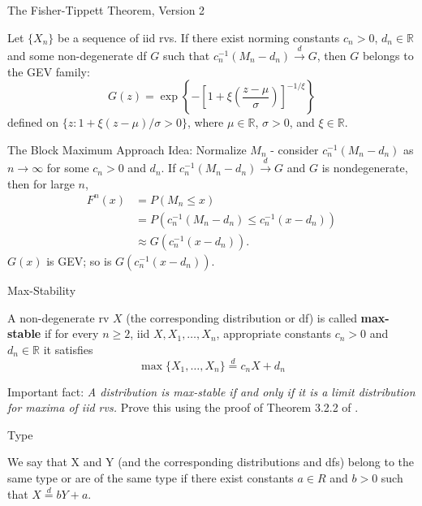 \documentclass{beamer}
\begin{document}
\begin{frame}{The Fisher-Tippett Theorem, Version 2}
    \begin{theorem}
        Let $\{X_n\}$ be a sequence of iid rvs. If there exist norming constants $c_n > 0$, $d_n \in \mathbb{R}$ and some non-degenerate df $G$ such that $c_n^{-1}(M_n - d_n) \xrightarrow{d} G$, then $G$ belongs to the GEV family:
        \[
        G(z) = \exp\left\{-\left[1 + \xi\left(\frac{z - \mu}{\sigma}\right)\right]^{-1 / \xi}\right\}
        \]
        defined on $\{z : 1 + \xi(z - \mu) / \sigma > 0\}$, where $\mu \in \mathbb{R}$, $\sigma > 0$, and $\xi \in \mathbb{R}$.
    \end{theorem}
\end{frame}

\begin{frame}{The Block Maximum Approach}
    Idea: Normalize $M_n$ - consider $c_n^{-1}(M_n - d_n)$ as $n \to \infty$ for some $c_n > 0$ and $d_n$. If $c_n^{-1}(M_n - d_n) \xrightarrow{d} G$ and $G$ is nondegenerate, then for large $n$,
    \begin{align*}
        F^n(x) &= P(M_n \le x) \\
        &= P(c_n^{-1}(M_n - d_n) \le c_n^{-1}(x - d_n)) \\
        &\approx G(c_n^{-1}(x - d_n)).
    \end{align*}
    $G(x)$ is GEV; so is $G(c_n^{-1}(x - d_n))$.
\end{frame}

\begin{frame}{Max-Stability}
    \begin{definition}
        A non-degenerate rv $X$ (the corresponding distribution or df) is called \textbf{max-stable} if for every $n \ge 2$, iid $X, X_1, \ldots, X_n$, appropriate constants $c_n > 0$ and $d_n \in \mathbb{R}$ it satisfies
        \[
        \max\{X_1, \ldots, X_n\} \overset{d}{=} c_n X + d_n
        \]
    \end{definition}
    Important fact: \textit{A distribution is max-stable if and only if it is a limit distribution for maxima of iid rvs.}
    Prove this using the proof of Theorem 3.2.2 of \cite{embrechts_et_al_1997}.
\end{frame}

\begin{frame}{Type}
    \begin{definition}
        We say that X and Y (and the corresponding distributions and dfs) belong to the same type or are of the same type if there exist constants $a \in R$ and $b > 0$ such that $X \overset{d}{=} b Y + a$.
    \end{definition}
\end{frame}
\end{document}
